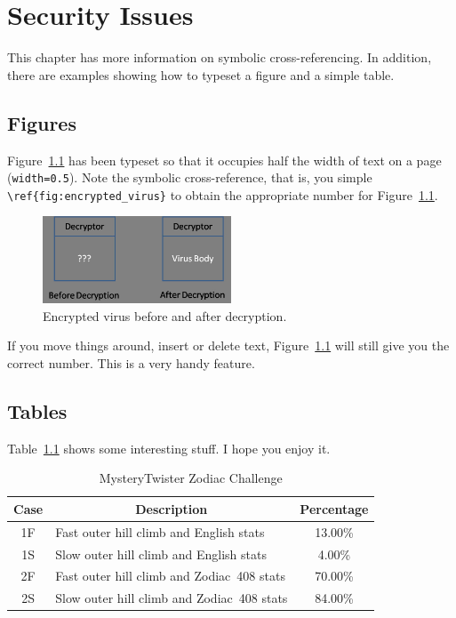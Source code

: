 \chapter{Security Issues}

This chapter has more information on symbolic cross-referencing.
In addition, there are examples showing how to typeset a figure
and a simple table.

\section{Figures}

Figure~\ref{fig:encrypted_virus} has been typeset so that it
occupies half the width of text on a page ({\tt width=0.5}). Note the 
symbolic cross-reference, that is, you simple \verb+\ref{fig:encrypted_virus}+
to obtain the appropriate number for Figure~\ref{fig:encrypted_virus}.

\begin{figure}[htb]
\centering
\includegraphics[width=0.5\textwidth]{images/encrypted_virus.jpg}
\caption{Encrypted virus before and after decryption.} 
\label{fig:encrypted_virus}
\end{figure}

If you move things around, insert or delete text, Figure~\ref{fig:encrypted_virus}
will still give you the correct number. This is a very handy feature.


\section{Tables}

Table~\ref{tab:19} 
shows some interesting stuff. I hope you enjoy it.

\begin{table}[htb]
\caption{MysteryTwister Zodiac Challenge\label{tab:19}}
\begin{center}
\begin{tabular}{c|lc}\hline\hline
Case & \multicolumn{1}{c}{Description} & Percentage\\ \hline
1F & Fast outer hill climb and English stats & 13.00\% \\
1S & Slow outer hill climb and English stats & \phantom{0}4.00\% \\
2F & Fast outer hill climb and Zodiac~408 stats & 70.00\% \\
2S & Slow outer hill climb and Zodiac~408 stats & 84.00\% \\ \hline\hline
\end{tabular}
\end{center}
\end{table}


